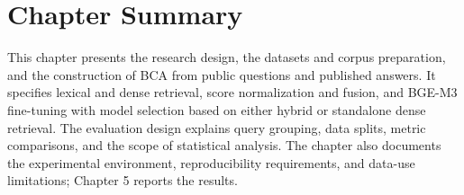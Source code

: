 \section{Chapter Summary}
\label{sec:method-summary}

This chapter presents the research design, the datasets and corpus preparation, and the construction of BCA from public questions and published answers. It specifies lexical and dense retrieval, score normalization and fusion, and BGE-M3 fine-tuning with model selection based on either hybrid or standalone dense retrieval. The evaluation design explains query grouping, data splits, metric comparisons, and the scope of statistical analysis. The chapter also documents the experimental environment, reproducibility requirements, and data-use limitations; Chapter 5 reports the results.
